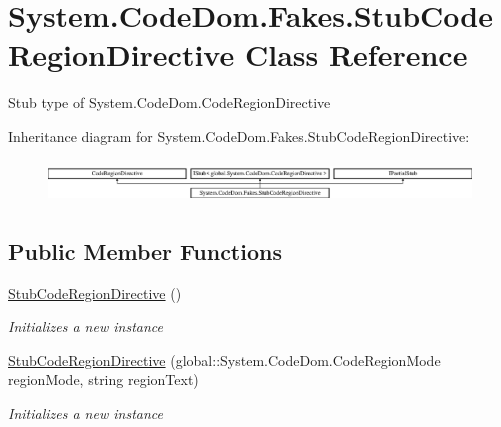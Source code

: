 \hypertarget{class_system_1_1_code_dom_1_1_fakes_1_1_stub_code_region_directive}{\section{System.\-Code\-Dom.\-Fakes.\-Stub\-Code\-Region\-Directive Class Reference}
\label{class_system_1_1_code_dom_1_1_fakes_1_1_stub_code_region_directive}
}


Stub type of System.\-Code\-Dom.\-Code\-Region\-Directive 


Inheritance diagram for System.\-Code\-Dom.\-Fakes.\-Stub\-Code\-Region\-Directive\-:\begin{figure}[H]
\begin{center}
\leavevmode
\includegraphics[height=1.121121cm]{class_system_1_1_code_dom_1_1_fakes_1_1_stub_code_region_directive}
\end{center}
\end{figure}
\subsection*{Public Member Functions}
\begin{DoxyCompactItemize}
\item 
\hyperlink{class_system_1_1_code_dom_1_1_fakes_1_1_stub_code_region_directive_a3c95f65ad7186707748f3933bb7dbc81}{Stub\-Code\-Region\-Directive} ()
\begin{DoxyCompactList}\small\item\em Initializes a new instance\end{DoxyCompactList}\item 
\hyperlink{class_system_1_1_code_dom_1_1_fakes_1_1_stub_code_region_directive_a1abc915cf213b2ec7f57a808ef780505}{Stub\-Code\-Region\-Directive} (global\-::\-System.\-Code\-Dom.\-Code\-Region\-Mode region\-Mode, string region\-Text)
\begin{DoxyCompactList}\small\item\em Initializes a new instance\end{DoxyCompactList}\end{DoxyCompactItemize}
